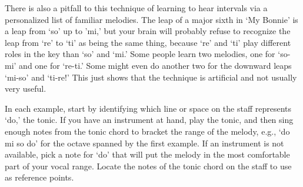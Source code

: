\documentclass{sight}
\begin{document}
\pagebreak[3]\par
\vspace{5mm}\begin{samepage}There is also a pitfall to this technique of learning to hear intervals via a personalized list of familiar melodies. The leap of a major sixth in `My Bonnie' is a leap from `so' up to 'mi,' but your brain will probably refuse to recognize the leap from `re' to `ti' as being the same thing, because `re' and `ti' play different roles in the key than `so' and `mi.' Some people learn two melodies, one for `so-mi' and one for `re-ti.' Some might even do another two for the downward leaps `mi-so' and `ti-re!' This just shows that the technique is artificial and not usually very useful.\\
\end{samepage}
\pagebreak[4]


\pagebreak[3]\par
\vspace{5mm}\begin{samepage}In each example, start by identifying which line or space on the staff represents `do,' the tonic. If you have an instrument at hand, play the tonic, and then sing enough notes from the tonic chord to bracket the range of the melody, e.g., `do mi so do' for the octave spanned by the first example. If an instrument is not available, pick a note for `do' that will put the melody in the most comfortable part of your vocal range. Locate the notes of the tonic chord on the staff to use as reference points.\\


\pagebreak[3]\par
{}%
\label{tune:27}%
{%
\parindent 0pt
\noindent
\ifx\preLilyPondExample \undefined
\else
  \expandafter\preLilyPondExample
\fi
\def\lilypondbook{}%

\ifx\postLilyPondExample \undefined
\else
  \expandafter\postLilyPondExample
\fi
}
\end{samepage}
\end{document}
